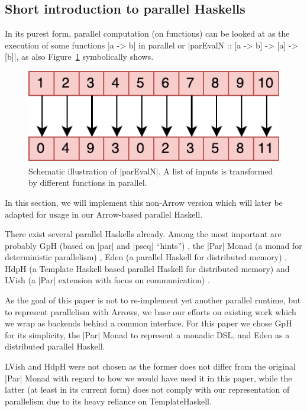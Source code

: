 \subsection{Short introduction to parallel Haskells}
\label{sec:parallelHaskells}
\label{sec:parEvalNIntro}
In its purest form, parallel computation (on functions) can be looked at as the execution of some functions |a -> b| in parallel or |parEvalN :: [a -> b] -> [a] -> [b]|, as also Figure~\ref{fig:parEvalN} symbolically shows.
\begin{figure}[t]
  \centering
	\includegraphics[scale=0.7]{images/parEvalN}
	\caption{Schematic illustration of |parEvalN|. A list of inputs is transformed by different functions in parallel.}
	\label{fig:parEvalN}
\end{figure}

In this section, we will implement this non-Arrow version which will later be adapted for usage in our Arrow-based parallel Haskell.

There exist several parallel Haskells already. Among the most important are probably GpH  (based on |par| and |pseq| \enquote{hints}) \cite{Trinder1996,Trinder1998a}, the |Par| Monad (a monad for deterministic parallelism) \cite{par-monad,Foltzer:2012:MPC:2398856.2364562}, Eden (a parallel Haskell for distributed memory) \cite{eden,Loogen2012}, HdpH (a Template Haskell based parallel Haskell for distributed memory) \cite{Maier:2014:HDS:2775050.2633363,stewart_maier_trinder_2016} and LVish (a |Par| extension with focus on communication) \cite{Kuper:2014:TPE:2666356.2594312}.

As the goal of this paper is not to re-implement yet another parallel runtime, but to represent parallelism with Arrows, we base our efforts on existing work which we wrap as backends behind a common interface. For this paper we chose GpH for its simplicity, the |Par| Monad to represent a monadic DSL, and Eden as a distributed parallel Haskell.

LVish and HdpH were not chosen as the former does not differ from the original |Par| Monad with regard to how we would have used it in this paper, while the latter (at least in its current form) does not comply with our representation of parallelism due to its heavy reliance on TemplateHaskell.

